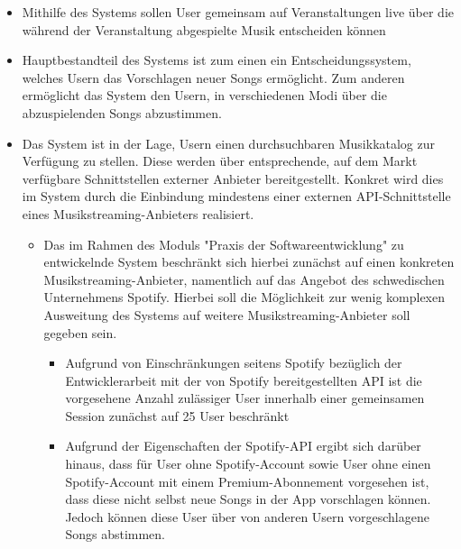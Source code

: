 \documentclass[oneside, ngerman]{sdqtechreport}
\begin{document}
\begin{itemize}
    \item Mithilfe des Systems sollen User gemeinsam auf Veranstaltungen live über die während der Veranstaltung abgespielte Musik entscheiden können
    \item Hauptbestandteil des Systems ist zum einen ein Entscheidungssystem, welches Usern das Vorschlagen neuer Songs ermöglicht. Zum anderen ermöglicht das System den Usern, in verschiedenen Modi über die abzuspielenden Songs abzustimmen.
    \item Das System ist in der Lage, Usern einen durchsuchbaren Musikkatalog zur Verfügung zu stellen. Diese werden über entsprechende, auf dem Markt verfügbare Schnittstellen externer Anbieter bereitgestellt. Konkret wird dies im System durch die Einbindung mindestens einer externen API-Schnittstelle eines Musikstreaming-Anbieters realisiert.
    \begin{itemize}
        \item Das im Rahmen des Moduls "Praxis der Softwareentwicklung" zu entwickelnde System beschränkt sich hierbei zunächst auf einen konkreten Musikstreaming-Anbieter, namentlich auf das Angebot des schwedischen Unternehmens Spotify. Hierbei soll die Möglichkeit zur wenig komplexen Ausweitung des Systems auf weitere Musikstreaming-Anbieter soll gegeben sein.
        \begin{itemize}
            \item Aufgrund von Einschränkungen seitens Spotify bezüglich der Entwicklerarbeit mit der von Spotify bereitgestellten API ist die vorgesehene Anzahl zulässiger User innerhalb einer gemeinsamen Session zunächst auf 25 User beschränkt
            \item Aufgrund der Eigenschaften der Spotify-API ergibt sich darüber hinaus, dass für User ohne Spotify-Account sowie User ohne einen Spotify-Account mit einem Premium-Abonnement vorgesehen ist, dass diese nicht selbst neue Songs in der App vorschlagen können. Jedoch können diese User über von anderen Usern vorgeschlagene Songs abstimmen.
        \end{itemize}


\end{itemize}
\end{itemize}
\end{document}
